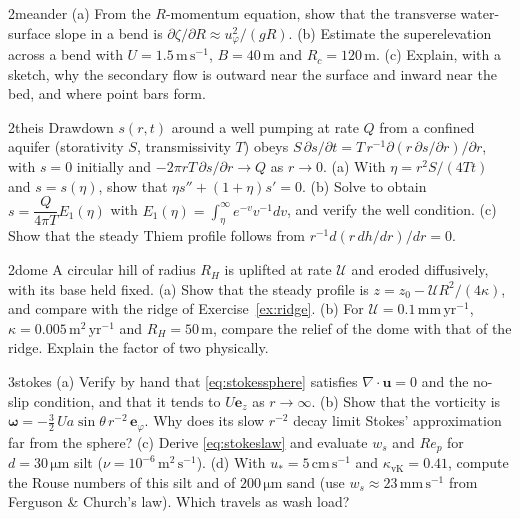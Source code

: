 \documentclass[11pt,letterpaper]{article}
\numberwithin{equation}{section}
\newcommand{\uu}{\mathbf{u}}
\newcommand{\e}[1]{\mathbf{e}_{#1}}
\newcommand{\bomega}{\bm{\omega}}
\newcommand{\units}[1]{\,\mathrm{#1}}
\newcommand{\Up}{\mathcal{U}}
\begin{document}
\begin{exercise}{2}{meander}
(a) From the $R$-momentum equation, show that the transverse water-surface slope in a bend is $\partial\zeta/\partial R\approx u_\varphi^2/(gR)$.
(b) Estimate the superelevation across a bend with $U=1.5\units{m\,s^{-1}}$, $B=40\units{m}$ and $R_c=120\units{m}$.
(c) Explain, with a sketch, why the secondary flow is outward near the surface and inward near the bed, and where point bars form.
\end{exercise}

\begin{exercise}{2}{theis}
Drawdown $s(r,t)$ around a well pumping at rate $Q$ from a confined aquifer (storativity $S$, transmissivity $T$) obeys
$S\,\partial s/\partial t=T\,r^{-1}\partial(r\,\partial s/\partial r)/\partial r$, with $s=0$ initially and $-2\pi rT\,\partial s/\partial r\to Q$ as $r\to0$.
(a) With $\eta=r^2S/(4Tt)$ and $s=s(\eta)$, show that $\eta s''+(1+\eta)s'=0$.
(b) Solve to obtain $s=\dfrac{Q}{4\pi T}E_1(\eta)$ with $E_1(\eta)=\int_\eta^\infty e^{-v}v^{-1}dv$, and verify the well condition.
(c) Show that the steady Thiem profile follows from $r^{-1}d(r\,dh/dr)/dr=0$.
\end{exercise}

\begin{exercise}{2}{dome}
A circular hill of radius $R_H$ is uplifted at rate $\Up$ and eroded diffusively, with its base held fixed.
(a) Show that the steady profile is $z=z_0-\Up R^2/(4\kappa)$, and compare with the ridge of Exercise~\ref{ex:ridge}.
(b) For $\Up=0.1\units{mm\,yr^{-1}}$, $\kappa=0.005\units{m^2\,yr^{-1}}$ and $R_H=50\units{m}$, compare the relief of the dome with that of the ridge.
Explain the factor of two physically.
\end{exercise}

\begin{exercise}{3}{stokes}
(a) Verify by hand that \eqref{eq:stokessphere} satisfies $\nabla\cdot\uu=0$ and the no-slip condition, and that it tends to $U\e{z}$ as
$r\to\infty$.
(b) Show that the vorticity is $\bomega=-\tfrac32\,Ua\sin\theta\,r^{-2}\,\e{\varphi}$. Why does its slow $r^{-2}$ decay limit Stokes' approximation far
from the sphere?
(c) Derive \eqref{eq:stokeslaw} and evaluate $w_s$ and $Re_p$ for $d=30\units{\mu m}$ silt ($\nu=10^{-6}\units{m^2\,s^{-1}}$).
(d) With $u_*=5\units{cm\,s^{-1}}$ and $\kappa_{\mathrm{vK}}=0.41$, compute the Rouse numbers of this silt and of $200\units{\mu m}$ sand
(use $w_s\approx23\units{mm\,s^{-1}}$ from Ferguson \& Church's law). Which travels as wash load?
\end{exercise}
\end{document}
